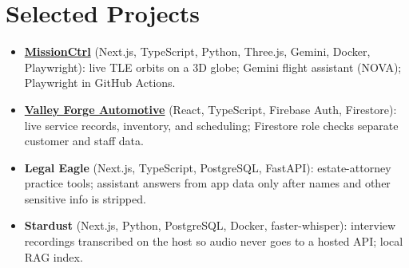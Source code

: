 \documentclass[11pt,a4paper,sans]{moderncv}
\begin{document}

\section{Selected Projects}
\vspace{1pt}
\begin{itemize}
\item \textbf{\href{https://missionctrl.org/}{MissionCtrl}} (Next.js, TypeScript, Python, Three.js, Gemini, Docker, Playwright): live TLE orbits on a 3D globe; Gemini flight assistant (NOVA); Playwright in GitHub Actions.
\item \textbf{\href{https://valleyforgeautomotive.org/}{Valley Forge Automotive}} (React, TypeScript, Firebase Auth, Firestore): live service records, inventory, and scheduling; Firestore role checks separate customer and staff data.
\item \textbf{Legal Eagle} (Next.js, TypeScript, PostgreSQL, FastAPI): estate-attorney practice tools; assistant answers from app data only after names and other sensitive info is stripped.
\item \textbf{Stardust} (Next.js, Python, PostgreSQL, Docker, faster-whisper): interview recordings transcribed on the host so audio never goes to a hosted API; local RAG index.
\end{itemize}

\vspace{3pt}

\end{document}
